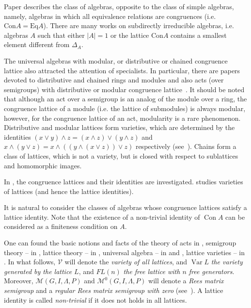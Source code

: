 \documentclass{birkau}
\numberwithin{equation}{section}
\theoremstyle{plain}
\theoremstyle{definition}
\DeclareMathOperator{\Con}{Con}
\DeclareMathOperator{\Var}{Var}
\begin{document}
	Paper \cite{resh} describes the class of algebras, opposite to the class of simple algebras, namely, algebras in which all equivalence relations are congruences (i.e. $ \text{Con}A = \text{Eq}A $).
    There are many works on subdirectly irreducible algebras, i.e. algebras $A$ such that either $ |A| = 1 $ or the lattice Con$A$ contains a smallest element different from $ \Delta_A $.
	
	The universal algebras with modular, or distributive or chained congruence lattice also attracted the attention of specialists. In particular, there are papers devoted to distributive and chained rings and modules and also acts (over semigroups) with distributive or modular congruence lattice~\cite{step,hal3}. It should be noted that although an act over a semigroup is an analog of the module over a ring, the congruence lattice of a module (i.e. the lattice of submodules) is always modular, however, for the congruence lattice of an act, modularity is a rare phenomenon. Distributive and modular lattices form varieties, which are determined by the identities $ (x \vee y) \wedge z = (x \wedge z ) \vee (y \wedge z) $ and $ x \wedge ( y \vee z ) = x \wedge (( y \wedge (x \vee z)) \vee z ) $ respectively (see~\cite[Chapter 4, Theorem 1.1]{gretz}).  Chains form a class of lattices, which is not a variety, but is closed with respect to sublattices and homomorphic images.
	
    In \cite{memoirs}, the congruence lattices and their identities are investigated. \cite{jipsen} studies varieties of lattices (and hence the lattice identities).
    
    It is natural to consider the classes of algebras whose congruence lattices satisfy a lattice identity.
    Note that the existence of a non-trivial identity of $\Con A$ can be considered as a finiteness condition on $A$.
    
    One can found the basic notions and facts of the theory of acts in \cite{kilp}, semigroup theory -- in \cite{cliff}, lattice theory -- in \cite{gretz}, universal algebra -- in \cite{burris} and  \cite{kon}, lattice varieties -- in \cite{jipsen}. 	
    In what follows, $\mathcal{V}$ will denote the \textit{variety of all lattices}, and $\Var L$ \textit{the variety generated by the lattice $L$}, and $FL(n)$ \textit{the free lattice with $n$ free generators}. Moreover, $\mathcal{M}(G,I,\Lambda,P)$ and $\mathcal{M}^0(G,I,\Lambda,P)$ will denote a \textit{Rees matrix semigroup} and a \textit{regular Rees matrix semigroup with zero} (see~\cite[Chapter 2]{cliff}). A lattice identity is called \textit{non-trivial} if it does not holds in all lattices.
	
\end{document}
